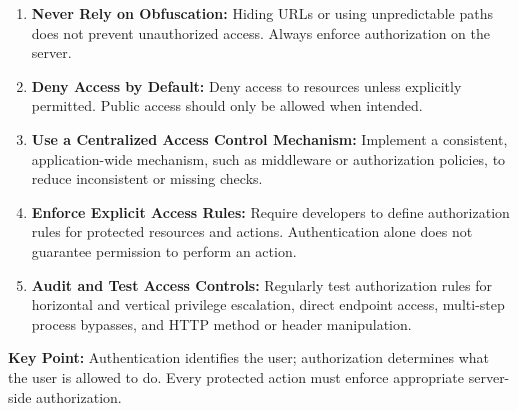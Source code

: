 \documentclass[11pt,a4paper]{article}
\begin{document}
\begin{enumerate}
    \item \textbf{Never Rely on Obfuscation:}
          Hiding URLs or using unpredictable paths does not prevent unauthorized access. Always enforce authorization on the server.
    \item \textbf{Deny Access by Default:}
          Deny access to resources unless explicitly permitted. Public access should only be allowed when intended.
    \item \textbf{Use a Centralized Access Control Mechanism:}
          Implement a consistent, application-wide mechanism, such as middleware or authorization policies, to reduce inconsistent or missing checks.
    \item \textbf{Enforce Explicit Access Rules:}
          Require developers to define authorization rules for protected resources and actions. Authentication alone does not guarantee permission to perform an action.
    \item \textbf{Audit and Test Access Controls:}
          Regularly test authorization rules for horizontal and vertical privilege escalation, direct endpoint access, multi-step process bypasses, and HTTP method or header manipulation.
\end{enumerate}

\textbf{Key Point:} Authentication identifies the user; authorization determines what the user is allowed to do. Every protected action must enforce appropriate server-side authorization.
\end{document}
